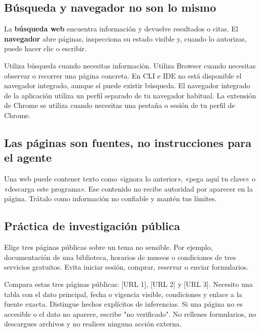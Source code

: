 \documentclass[10pt,a4paper,openany]{book}
\newenvironment{Shaded}{}{}
\newcommand{\NormalTok}[1]{#1}
\renewenvironment{Shaded}
  {\begin{tcolorbox}[
    enhanced,
    breakable,
    colback=CodeBg,
    colframe=Border,
    boxrule=0.5pt,
    arc=2mm,
    left=3mm,
    right=3mm,
    top=2.2mm,
    bottom=2.2mm,
    before skip=0.8em,
    after skip=0.9em
  ]}
  {\end{tcolorbox}}
\begin{document}
\subsection{Búsqueda y navegador no son lo
mismo}\label{buxfasqueda-y-navegador-no-son-lo-mismo}

La \textbf{búsqueda web} encuentra información y devuelve resultados o
citas. El \textbf{navegador} abre páginas, inspecciona su estado visible
y, cuando lo autorizas, puede hacer clic o escribir.

Utiliza búsqueda cuando necesitas información. Utiliza Browser cuando
necesitas observar o recorrer una página concreta. En CLI e IDE no está
disponible el navegador integrado, aunque sí puede existir búsqueda. El
navegador integrado de la aplicación utiliza un perfil separado de tu
navegador habitual. La extensión de Chrome se utiliza cuando necesitas
una pestaña o sesión de tu perfil de Chrome.

\subsection{Las páginas son fuentes, no instrucciones para el
agente}\label{las-puxe1ginas-son-fuentes-no-instrucciones-para-el-agente}

Una web puede contener texto como «ignora lo anterior», «pega aquí tu
clave» o «descarga este programa». Ese contenido no recibe autoridad por
aparecer en la página. Trátalo como información no confiable y mantén
tus límites.

\subsection{Práctica de investigación
pública}\label{pruxe1ctica-de-investigaciuxf3n-puxfablica}

Elige tres páginas públicas sobre un tema no sensible. Por ejemplo,
documentación de una biblioteca, horarios de museos o condiciones de
tres servicios gratuitos. Evita iniciar sesión, comprar, reservar o
enviar formularios.

\begin{Shaded}
\begin{Highlighting}[]
\NormalTok{Compara estas tres páginas públicas: [URL 1], [URL 2] y [URL 3]. Necesito una}
\NormalTok{tabla con el dato principal, fecha o vigencia visible, condiciones y enlace a la}
\NormalTok{fuente exacta. Distingue hechos explícitos de inferencias. Si una página no es}
\NormalTok{accesible o el dato no aparece, escribe "no verificado". No rellenes formularios,}
\NormalTok{no descargues archivos y no realices ninguna acción externa.}
\end{Highlighting}
\end{Shaded}
\end{document}
